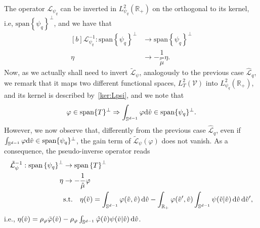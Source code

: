 \documentclass[a4paper]{article}
\theoremstyle{Theorem}\newtheorem{proposition}{Proposition}[section]
\theoremstyle{Remark}\newtheorem{remark}{Remark}[section]
\theoremstyle{Theorem}\newtheorem{theorem}{Theorem}[section]
\newcommand{\R}{\mathbb{R}}
\newcommand{\hv}{\hat{v}}
\newcommand{\tv}{\tilde{v}}
\newcommand{\hphi}{\hat{\varphi}}
\newcommand{\tphi}{\tilde{\varphi}}
\newcommand{\tmu}{\tilde{\mu}}
\newcommand{\intS}{\int_{\mathbb{S}^{d-1}}}
\newcommand{\intR}{\int_{\R_+}}
\begin{document}
The operator $\mathcal{L}_{\psi_q}$ can be inverted in $L^2_{\psi_q}(\R_+)$ on the orthogonal to its kernel, i.e, $\text{span}\left\lbrace \psi_q\right\rbrace^{\bot}$, and we have that
\begin{equation*}
\begin{aligned}[b]
    \mathcal{L}_{\psi_q}^{-1}:  \text{span}\left\lbrace \psi_q\right\rbrace^{\bot} &\to \text{span}\left\lbrace \psi_q\right\rbrace^{\bot}\\
    \eta &\to -\dfrac{1}{\tmu}\eta.
    \end{aligned}
\end{equation*}
Now, as we actually shall need to invert $\tilde{\mathcal{L}}_\psi$, analogously to the previous case $\hat{\mathcal{L}}_q$, we remark that it maps two different functional spaces, $L^2_T(\mathcal{V})$ into $L^2_{\psi_q}(\R_+)$, and its kernel is described by~\eqref{ker:Lpsi}, and we note that
\begin{equation*}\label{psibot}
    \varphi \in \text{span}\lbrace T \rbrace^{\bot} \Rightarrow  \intS \varphi {\rm d}\hv \in \text{span}\lbrace \psi_q \rbrace^{\bot}.
\end{equation*}
However, we now observe that, differently from the previous case $\hat{\mathcal{L}}_q$, even if $\intS \varphi {\rm d}\hv \in \text{span}\lbrace \psi_q \rbrace^{\bot}$, the gain term of $\tilde{\mathcal{L}}_\psi(\varphi)$ does not vanish. As a consequence, the pseudo-inverse operator reads
\begin{equation}\label{Lpsi.inv}
\begin{aligned}[b]
    \tilde{\mathcal{L}}_{\psi}^{-1}:  \text{span}\left\lbrace \psi_q\right\rbrace^{\bot} &\to \text{span}\left\lbrace T\right\rbrace^{\bot}\\
    \eta &\to -\dfrac{1}{\tmu}\varphi\\ &\text{s.t.} \quad \eta(\tv)=  \intS \varphi(\tv,\hv) \, {\rm d} \hv -\intR \varphi (\tv', \hv) \intS \psi(\tv|\hv) \, {\rm d} \hv\, {\rm d} \tv',
    \end{aligned}
\end{equation}
i.e., $\eta(\tv)= \rho_\varphi \tphi(\tv)-\rho_\varphi \intS\hphi(\hv) \psi(\tv|\hv) \, {\rm d} \hv $.
\end{document}

